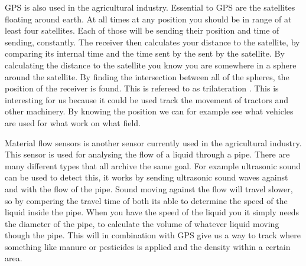 GPS is also used in the agricultural industry. Essential to GPS are the satellites floating around earth. At all times at any position you should be in range of at least four satellites. Each of those will be sending their position and time of sending, constantly. The receiver then calculates your distance to the satellite, by comparing its internal time and the time sent by the sent by the satellite. By calculating the distance to the satellite you know you are somewhere in a sphere around the satellite. By finding the intersection between all of the spheres, the position of the receiver is found. This is refereed to as trilateration \cite{sensor:gps}\cite{sensor:gps_physics}.\newline
This is interesting for us because it could be used track the movement of tractors and other machinery. By knowing the position we can for example see what vehicles are used for what work on what field. \newline


Material flow sensors is another sensor currently used in the agricultural industry. This sensor is used for analysing the flow of a liquid through a pipe. There are many different types that all archive the same goal. For example ultrasonic sound can be used to detect this, it works by sending ultrasonic sound waves against and with the flow of the pipe. Sound moving against the flow will travel slower, so by compering the travel time of both its able to determine the speed of the liquid inside the pipe. When you have the speed of the liquid you it simply needs the diameter of the pipe, to calculate the volume of whatever liquid moving though the pipe\cite{sensor:ultrasonic}.\newline
This will in combination with GPS give us a way to track where something like manure or pesticides is applied and the density within a certain area. \newline
